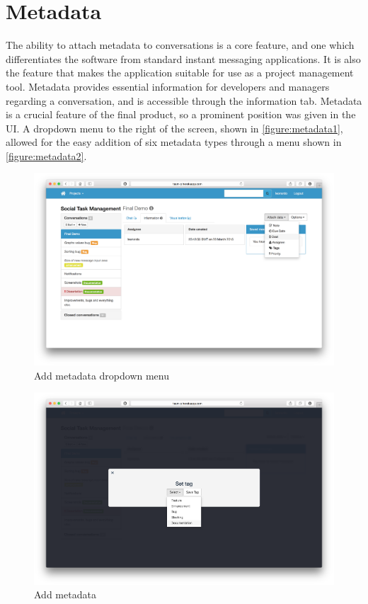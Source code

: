 \documentclass[a4paper]{l3proj}
\begin{document}
\section{Metadata}
\label{metadata}

The ability to attach metadata to conversations is a core feature, and one which differentiates the software from standard instant messaging applications. It is also the feature that makes the application suitable for use as a project management tool. Metadata provides essential information for developers and managers regarding a conversation, and is accessible through the information tab. Metadata is a crucial feature of the final product, so a prominent position was given in the UI. A dropdown menu to the right of the screen, shown in \autoref{figure:metadata1}, allowed for the easy addition of six metadata types through a menu shown in \autoref{figure:metadata2}.

\begin{figure}
\centering
\includegraphics[scale=0.3]{dropdownMenu}
\caption{Add metadata dropdown menu}
\label{figure:metadata1}
\end{figure}

\begin{figure}
\centering
\includegraphics[scale=0.3]{addMetadata}
\caption{Add metadata}
\label{figure:metadata2}
\end{figure}
\end{document}
